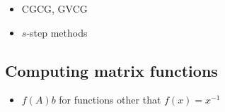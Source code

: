 \begin{itemize}
\tightlist
\item
  CGCG, GVCG
\item
  \(s\)-step methods
\end{itemize}

\hypertarget{computing-matrix-functions}{%
\subsection{Computing matrix
functions}\label{computing-matrix-functions}}

\begin{itemize}
\tightlist
\item
  \(f(A)b\) for functions other that \(f(x) = x^{-1}\)
\end{itemize}
